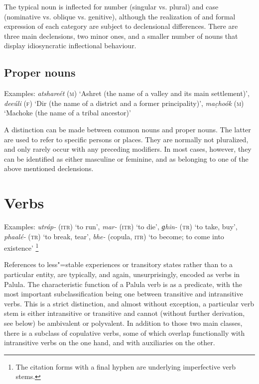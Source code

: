 The typical noun is inflected for number (singular vs. plural) and case (nominative vs. oblique vs. genitive), although the realization of and formal expression of each category are subject to declensional differences. There are three main declensions, two minor ones, and a smaller number of nouns that display idiosyncratic inflectional behaviour.


\subsection{Proper nouns}
\label{subsec:3b-2-1}
Examples: \textit{atshareét} (\textsc{m}) `Ashret (the name of a valley and its main settlement)', \textit{deeúli} (\textsc{f}) `Dir (the name of a district and a former principality)', \textit{mac̣hoók} (\textsc{m}) `Machoke (the name of a tribal ancestor)'


A distinction can be made between common nouns and proper nouns. The latter are used to refer to specific persons or places. They are normally not pluralized, and only rarely occur with any preceding modifiers. In most cases, however, they can be identified as either masculine or feminine, and as belonging to one of the above mentioned declensions.

\section{Verbs}
\label{sec:3b-3}

Examples: \textit{utráp-} (\textsc{itr}) `to run', \textit{mar-} (\textsc{itr}) `to die', \textit{ɡhin-} (\textsc{tr}) `to take, buy', \textit{phaalé-} (\textsc{tr}) `to break, tear', \textit{bhe-} (copula, \textsc{itr}) `to become; to come into existence' \footnote{The citation forms with a final hyphen are underlying imperfective verb stems.}


References to less"=stable experiences or transitory states rather than to a particular entity, are typically, and again, unsurprisingly, encoded as verbs in Palula. The characteristic function of a Palula verb is as a predicate, with the most important subclassification being one between transitive and intransitive verbs. This is a strict distinction, and almost without exception, a particular verb stem is either intransitive or transitive and cannot (without further derivation, see below) be ambivalent or polyvalent. In addition to those two main classes, there is a subclass of copulative verbs, some of which overlap functionally with intransitive verbs on the one hand, and with auxiliaries on the other.


